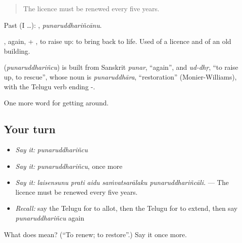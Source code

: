 \begin{quote}
The licence must be renewed every five years.
\end{quote}

Past (I …): , \emph{punaruddhariñcānu}.

, again, + , to raise up: to bring back to life. Used of a licence and of an old building.

\begin{cousinweb}
\textbf{} (\emph{punaruddhariñcu}) is built from Sanskrit \emph{punar}, \textquotedblleft{}again\textquotedblright{}, and \emph{ud-dhṛ}, \textquotedblleft{}to raise up, to rescue\textquotedblright{}, whose noun is \emph{punaruddhāra}, \textquotedblleft{}restoration\textquotedblright{} (Monier-Williams), with the Telugu verb ending -.
\end{cousinweb}

\begin{grammarlens}[title={What you've built}]
One more word for getting around.
\end{grammarlens}

\subsection*{Your turn}
\begin{itemize}
\raggedright
  \item \emph{Say it:} \emph{punaruddhariñcu}
  \item \emph{Say it:} \emph{punaruddhariñcu}, once more
  \item \emph{Say it:} \emph{laisensunu prati aidu saṁvatsarālaku punaruddhariñcāli.} — The licence must be renewed every five years.
  \item \emph{Recall:} say the Telugu for to allot, then the Telugu for to extend, then say \emph{punaruddhariñcu} again
\end{itemize}

\begin{tcolorbox}[breakable,colback=teal!4,colframe=teal!35!black,title={Before you move on}]
What does  mean? (\textquotedblleft{}To renew; to restore\textquotedblright{}.) Say it once more.
\end{tcolorbox}
